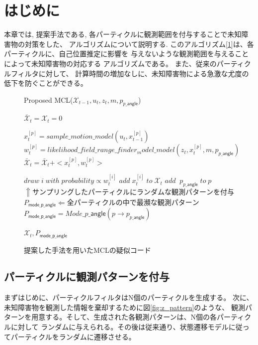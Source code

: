 \section{はじめに}
本章では, 提案手法である, 各パーティクルに観測範囲を付与することで未知障害物の対策をした、
アルゴリズムについて説明する. 
このアルゴリズム[\ref{alg:proposed_mcl}]は、各パーティクルに、自己位置推定に影響を
与えないような観測範囲を与えることによって未知障害物の対応する
アルゴリズムである。
また、従来のパーティクルフィルタに対して、
計算時間の増加なしに、未知障害物による急激な尤度の低下を防ぐことができる。

\begin{figure}[h]
  \begin{algorithm}[H]
      \caption{Proposed MCL($\mathcal{X}_{t-1}, u_t, z_t, m , p_{p\_\mathsf{angle}}$)}
      \label{alg:proposed_mcl}
      \begin{algorithmic}
      \STATE $\mathcal{\bar{X}}_t = \mathcal{X}_t = 0$

      \STATE $x_{t}^{[p]} = sample\_motion\_model(u_{t}, x_{t-1}^{[p]})$
      \STATE $w_{t}^{[p]} = likelihood\_field\_range\_finder_model\_model(z_{t}, x_{t}^{[p]}, m, p_{p\_\mathsf{angle}})$
      \STATE $\mathcal{\bar{X}}_t = \mathcal{\bar{X}}_t + <x_{t}^{[p]}, w_{t}^{[p]}>$
      \ENDFOR

      \STATE $draw\;i\;with\;probability \propto w_{t}^{[i]}$
      \STATE $add\; x_{t}^{[i]}\;to\;\mathcal{X}_t$
      \STATE $add\;\;p_{p\_\mathsf{angle}}\;to\;p$
      \STATE $\Uparrow サンプリングしたパーティクルにランダムな観測パターンを付与$
      \ENDFOR
      \STATE $P_\mathsf{mode\_p\_\mathsf{angle}} \Leftarrow 全パーティクルの中で最瀕な観測パターン$
      \STATE $P_\mathsf{mode\_p\_\mathsf{angle}} = Mode\_p\_\mathsf{angle}(p\rightarrow p_{p\_\mathsf{angle}})$
      \ENDFOR
      
      \RETURN $\mathcal{X}_t, P_\mathsf{mode\_p\_\mathsf{angle}}$
      \end{algorithmic}
  \end{algorithm}
  \caption{提案した手法を用いたMCLの疑似コード}
\end{figure}

\subsection{パーティクルに観測パターンを付与}
まずはじめに、パーティクルフィルタはN個のパーティクルを生成する。
次に、未知障害物を観測した情報を棄却するために図\ref{fig:z_pattern}のような、
観測パターンを用意する。そして、生成された各観測パターンは、N個の各パーティクルに対して
ランダムに与えられる。その後は従来通り、状態遷移モデルに従ってパーティクルをランダムに遷移させる。

